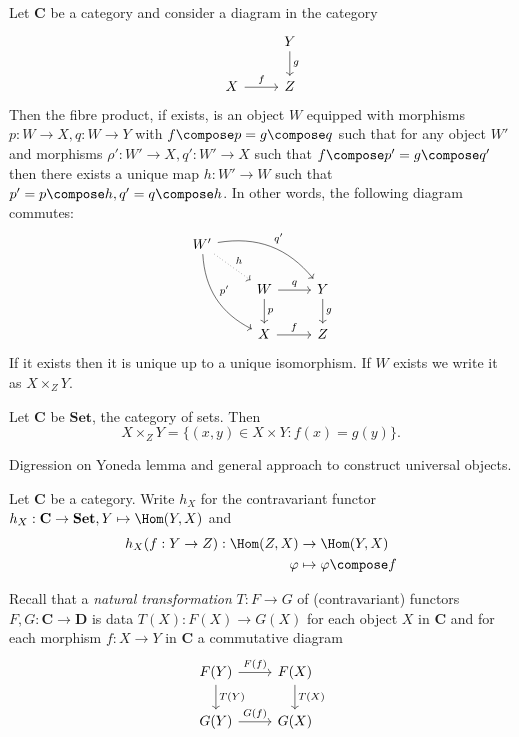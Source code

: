 \documentclass[a4paper]{article}
\renewcommand{\c}[1]{\mathbf{#1}} %
\begin{document}
Let \(\c C\) be a category and consider a diagram in the category
\[
  \begin{tikzcd}
    & Y \ar[d, "g"] \\
    X \ar[r, "f"] & Z
  \end{tikzcd}
\]
Then the fibre product, if exists, is an object \(W\) equipped with morphisms \(p: W \to X, q: W \to Y\) with \(f \compose p = g \compose q\) such that for any object \(W'\) and morphisms \(\rho': W' \to X, q': W' \to X\) such that \(f \compose p' = g \compose q'\) then there exists a unique map \(h: W' \to W\) such that \(p' = p \compose h, q' = q \compose h\). In other words, the following diagram commutes:
\[
  \begin{tikzcd}
    W' \ar[drr, "q'", bend left] \ar[ddr, "p'", bend right] \ar[dr, "h", dotted] \\
    & W \ar[r, "q"] \ar[d, "p"] & Y \ar[d, "g"] \\
    & X \ar[r, "f"] & Z
  \end{tikzcd}
\]
If it exists then it is unique up to a unique isomorphism. If \(W\) exists we write it as \(X \times_Z Y\).

\begin{eg}
  Let \(\c C\) be \(\c{Set}\), the category of sets. Then
  \[
    X \times_Z Y = \{(x, y) \in X \times Y: f(x) = g(y)\}.
  \]
\end{eg}

Digression on Yoneda lemma and general approach to construct universal objects.

\begin{definition}
  Let \(\c C\) be a category. Write \(h_X\) for the contravariant functor \(h_X: \c C \to \c{Set}, Y \mapsto \Hom(Y, X)\) and
  \begin{align*}
    h_X(f: Y \to Z): \Hom(Z, X) &\to \Hom(Y, X) \\
    \varphi &\mapsto \varphi \compose f
  \end{align*}
\end{definition}

Recall that a \emph{natural transformation} \(T: F \to G\) of (contravariant) functors \(F, G: \c C \to \c D\) is data \(T(X): F(X) \to G(X)\) for each object \(X\) in \(\c C\) and for each morphism \(f: X \to Y\) in \(\c C\) a commutative diagram
\[
  \begin{tikzcd}
    F(Y) \ar[r, "F(f)"] \ar[d, "T(Y)"] & F(X) \ar[d, "T(X)"] \\
    G(Y) \ar[r, "G(f)"] & G(X)
  \end{tikzcd}
\]
\end{document}
